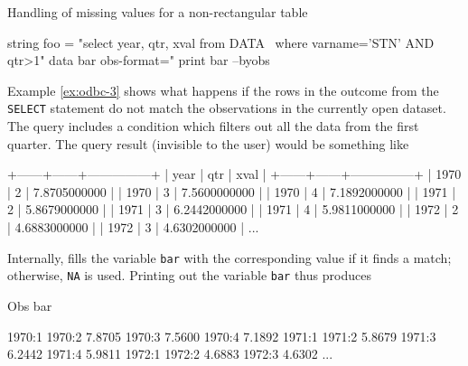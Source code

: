 \begin{script}[htbp]
  \caption{Handling of missing values for a non-rectangular table}
  \label{ex:odbc-3}
\begin{scode}
string foo = "select year, qtr, xval from DATA \
       where varname='STN' AND qtr>1"
data bar obs-format="%
print bar --byobs
\end{scode}

Example \ref{ex:odbc-3} shows what happens if the rows in
the outcome from the \texttt{SELECT} statement do not match the
observations in the currently open  dataset. The query
includes a condition which filters out all the data from the first
quarter. The query result (invisible to the user) would be something
like
\begin{code}
+------+------+---------------+
| year | qtr  | xval          |
+------+------+---------------+
| 1970 |    2 |  7.8705000000 | 
| 1970 |    3 |  7.5600000000 | 
| 1970 |    4 |  7.1892000000 | 
| 1971 |    2 |  5.8679000000 | 
| 1971 |    3 |  6.2442000000 | 
| 1971 |    4 |  5.9811000000 | 
| 1972 |    2 |  4.6883000000 | 
| 1972 |    3 |  4.6302000000 | 
...
\end{code}
Internally,  fills the variable \texttt{bar} with the
corresponding value if it finds a match; otherwise, \texttt{NA} is
used. Printing out the variable \texttt{bar} thus produces
\begin{code}
     Obs           bar

  1970:1              
  1970:2        7.8705
  1970:3        7.5600
  1970:4        7.1892
  1971:1              
  1971:2        5.8679
  1971:3        6.2442
  1971:4        5.9811
  1972:1              
  1972:2        4.6883
  1972:3        4.6302
...
\end{code}

\end{script}
